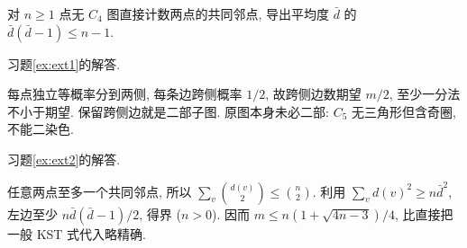 \begin{exercise}\label{ex:ext2}
对 $n\ge1$ 点无 $C_4$ 图直接计数两点的共同邻点, 导出平均度 $\bar d$ 的 $\bar d(\bar d-1)\le n-1$.
\end{exercise}
习题\ref{ex:ext1}的解答.
\begin{solution}
每点独立等概率分到两侧, 每条边跨侧概率 $1/2$, 故跨侧边数期望 $m/2$, 至少一分法不小于期望. 保留跨侧边就是二部子图. 原图本身未必二部: $C_5$ 无三角形但含奇圈, 不能二染色.
\end{solution}
习题\ref{ex:ext2}的解答.
\begin{solution}
任意两点至多一个共同邻点, 所以 $\sum_v\binom{d(v)}2\le\binom n2$. 利用 $\sum_vd(v)^2\ge n\bar d^2$, 左边至少 $n\bar d(\bar d-1)/2$, 得界 ($n>0$). 因而 $m\le n(1+\sqrt{4n-3})/4$, 比直接把一般 KST 式代入略精确.
\end{solution}

